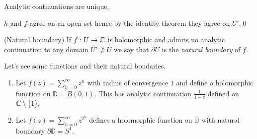 \documentclass{article}
\begin{document}
\begin{corollary}
  Analytic continuations are unique.
\end{corollary}
\pf $ h $ and $ f $ agree on an open set hence by the identity theorem they agree on $ U' $.\qed
\begin{definition}
	(Natural boundary) If $ f:U\to \mathbb{C} $ is holomorphic and admits no analytic continuation to any domain $ U'\not\supseteq U $ we say that $ \partial U $ is the \textit{natural boundary} of $ f $.
\end{definition}
\begin{example}
  Let's see some functions and their natural boudaries.
  \begin{enumerate}
	  \item Let $ f(z) =\sum_{n=0}^\infty z^n $ with radius of convergence $ 1 $ and define a holomorphic function on $ \mathbb D = B(0,1) $. This has analytic continuation $ \frac 1{1-z} $ defined on $ \mathbb{C}\setminus \{1\}. $
	  \item Let $ f(z) = \sum_{n=0}^\infty z^{2^n} $ defines a holomorphic function on $ \mathbb D $ with natural boundary $ \partial \mathbb D = S^1 $.
  \end{enumerate}
\end{example}
\end{document}
